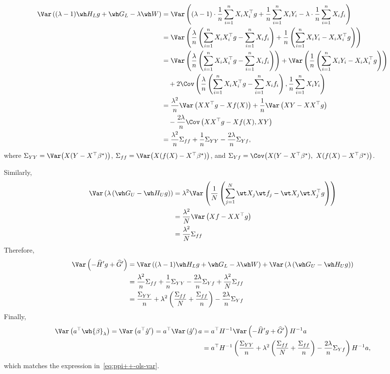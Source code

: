 \begin{align*}
    \Var\left((\lambda-1)\wh H_Lg +\wh G_L-\lambda\wh W\right)
    &=\Var\left((\lambda-1)\cdot\frac{1}{n}\sum^n_{i=1}X_iX_i^\top g+\frac{1}{n}\sum^n_{i=1}X_iY_i-\lambda\cdot \frac{1}{n}\sum^n_{i=1}X_if_i\right)\\
    &=\Var\left(\frac{\lambda}{n}\left(\sum^n_{i=1} X_iX_i^\top g-\sum^n_{i=1}X_if_i\right)
    +\frac{1}{n}\left(\sum^n_{i=1}X_iY_i-X_iX_i^\top g\right)\right)\\
    &=\Var\left(\frac{\lambda}{n}\left(\sum^n_{i=1} X_iX_i^\top g-\sum^n_{i=1}X_if_i\right)\right)
    +\Var\left(\frac{1}{n}\left(\sum^n_{i=1}X_iY_i-X_iX_i^\top g\right)\right)
    \\
    &\quad +2\Cov\left(\frac{\lambda}{n}\left(\sum^n_{i=1} X_iX_i^\top g-\sum^n_{i=1}X_if_i\right),\frac{1}{n}\sum^n_{i=1}X_iY_i\right)\\
    &=\frac{\lambda^2}{n}\Var\left( XX^\top g-Xf(X)\right)+\frac{1}{n}\Var\left(XY-XX^\top g\right)\\
    &\quad -\frac{2\lambda}{n}\Cov\left(XX^\top g-Xf(X),XY\right)\\
    &=\frac{\lambda^2}{n}\Sigma_{ff}+\frac{1}{n}\Sigma_{YY}-\frac{2\lambda}{n}\Sigma_{Yf},
\end{align*}where $\Sigma_{YY}=\Var\big(X(Y-X^\top\beta^\star)\big)$, $\Sigma_{ff}=\Var\big(X(f(X)-X^\top\beta^\star)\big)$, and $\Sigma_{Yf}=\Cov\big(X(Y-X^\top\beta^\star),\ X(f(X)-X^\top\beta^\star)\big)$.

\noindent
Similarly,
\begin{align*}
    \Var\left(\lambda\left( \wh G_U-\wh H_U g\right)\right)
    &=\lambda^2\Var\left(\frac{1}{N}\left(\sum^N_{j=1}\wt X_j\wt f_j-\wt X_j \wt X_j^\top g\right)\right)\\
    &=\frac{\lambda^2}{N}\Var\left(X f- XX^\top g\right)\\
    &=\frac{\lambda^2}{N}\Sigma_{ff}
\end{align*}
Therefore,
\begin{align*}
\Var\left(-\widehat{H}^\prime g+\widehat{G}^\prime\right)
&=\Var\left((\lambda-1)\wh H_Lg +\wh G_L-\lambda\wh W\right)
    +\Var\left(\lambda\left( \wh G_U-\wh H_U g\right)\right)\\
    &=\frac{\lambda^2}{n}\Sigma_{ff}+\frac{1}{n}\Sigma_{YY}-\frac{2\lambda}{n}\Sigma_{Yf}+\frac{\lambda^2}{N}\Sigma_{ff}\\
    &=\frac{\Sigma_{YY}}{n}+\lambda^2\left(\frac{\Sigma_{ff}}{N}+\frac{\Sigma_{ff}}{n}\right)-\frac{2\lambda}{n}\Sigma_{Yf}
\end{align*}
Finally,  
\begin{align*}
    \Var\left(a^\top\wh{\beta}_{\lambda}\right)
    =\Var\left(a^\top\hat g^\prime\right)
    =a^\top\Var\left(\hat g^\prime\right)a
    &=a^\top H^{-1}\Var\left(-\widehat{H}^\prime g+\widehat{G}^\prime\right)H^{-1}a\\
    &=a^\top H^{-1}\left(\frac{\Sigma_{YY}}{n}+\lambda^2\left(\frac{\Sigma_{ff}}{N}+\frac{\Sigma_{ff}}{n}\right)-\frac{2\lambda}{n}\Sigma_{Yf}\right)H^{-1}a,
\end{align*}which matches the expression in~\eqref{eq:ppi++-ols-var}.

